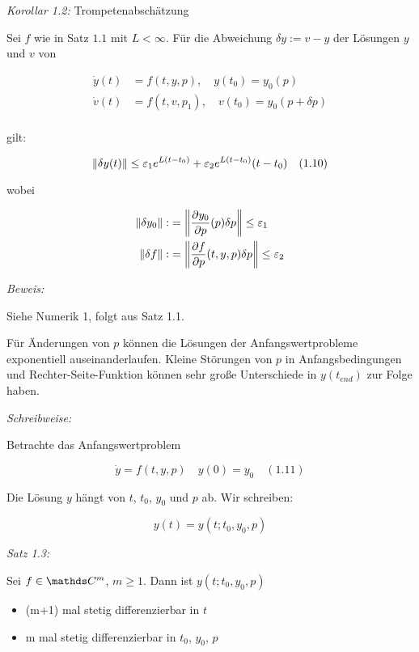 \emph{Korollar 1.2:} Trompetenabschätzung

Sei $f$ wie in Satz $1.1$ mit $L < \infty$. Für die Abweichung $\delta y := v-y$ der Lösungen $y$ und $v$ von

\begin{align*}
\dot y(t) &= f(t,y,p), \quad y(t_0) = y_0(p) \\
\dot v(t) &= f(t,v,p_1), \quad v(t_0) = y_0(p + \delta p) \\
\end{align*}

gilt:

\[ \|\delta y(t) \| \leq \varepsilon_1 e^{L(t-t_0)} + \varepsilon_2 e^{L(t-t_0)}(t-t_0) \quad (1.10)\]

wobei

\begin{align*}
\|\delta y_0\| :&= \left\| \frac{\partial y_0}{\partial p} (p) \delta p \right\| \leq \varepsilon_1 \\
\|\delta f\| :&= \left\| \frac{\partial f}{\partial p} (t,y,p) \delta p \right\| \leq \varepsilon_2
\end{align*}

\emph{Beweis:}

Siehe Numerik 1, folgt aus Satz 1.1.


Für Änderungen von $p$ können die Lösungen der Anfangswertprobleme exponentiell auseinanderlaufen. Kleine Störungen von $p$ in Anfangsbedingungen und Rechter-Seite-Funktion können sehr große Unterschiede in $y(t_{end})$ zur Folge haben.


\emph{Schreibweise:}

Betrachte das Anfangswertproblem

\[ \dot y = f(t,y,p) \quad y(0) = y_0 \quad (1.11) \]

Die Lösung $y$ hängt von $t$, $t_0$, $y_0$ und $p$ ab. Wir schreiben:

\[ y(t) = y(t; t_0, y_0, p) \]

\emph{Satz 1.3:}

Sei $f \in \C^m$, $m \geq 1$. Dann ist $y(t; t_0, y_0, p)$

\begin{itemize}
\item (m+1) mal stetig differenzierbar in $t$
\item m mal stetig differenzierbar in $t_0$, $y_0$, $p$
\end{itemize}

